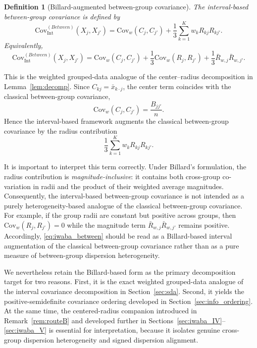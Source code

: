 \documentclass[preprint, times, 12pt, authoryear]{elsarticle}
\newtheorem{definition}{Definition}
\begin{document}
\begin{definition}[Billard-augmented between-group covariance]\label{def:iwaba_between}
	The interval-based between-group covariance is defined by
	\begin{equation}\label{eq:iwaba_between}
		\mathrm{Cov}_{\mathrm{Int}}^{(Between)}(X_j,X_{j'})
		=
		\mathrm{Cov}_w(C_j,C_{j'})
		+
		\frac{1}{3}\sum_{k=1}^K w_k R_{kj}R_{kj'}.
	\end{equation}
	Equivalently,
	\begin{equation}\label{eq:iwaba_decomp}
		\mathrm{Cov}_{\mathrm{Int}}^{(Between)}(X_j,X_{j'})
		=
		\mathrm{Cov}_w(C_j,C_{j'})
		+
		\frac{1}{3}\mathrm{Cov}_w(R_j,R_{j'})
		+
		\frac{1}{3}\bar R_{w,j}\bar R_{w,j'}.
	\end{equation}
\end{definition}

This is the weighted grouped-data analogue of the center--radius decomposition in Lemma~\ref{lem:decomp}. Since $C_{kj}=\bar x_{k\cdot j}$, the center term coincides with the classical between-group covariance,
\[
\mathrm{Cov}_w(C_j,C_{j'})=\frac{B_{jj'}}{n}.
\]
Hence the interval-based framework augments the classical between-group covariance by the radius contribution
\[
\frac{1}{3}\sum_{k=1}^K w_k R_{kj}R_{kj'}.
\]

It is important to interpret this term correctly. Under Billard's formulation, the radius contribution is \emph{magnitude-inclusive}: it contains both cross-group co-variation in radii and the product of their weighted average magnitudes. Consequently, the interval-based between-group covariance is not intended as a purely heterogeneity-based analogue of the classical between-group covariance. For example, if the group radii are constant but positive across groups, then $\mathrm{Cov}_w(R_j,R_{j'})=0$ while the magnitude term $\bar R_{w,j}\bar R_{w,j'}$ remains positive. Accordingly, \eqref{eq:iwaba_between} should be read as a Billard-based interval augmentation of the classical between-group covariance rather than as a pure measure of between-group dispersion heterogeneity.

We nevertheless retain the Billard-based form as the primary decomposition target for two reasons. First, it is the exact weighted grouped-data analogue of the interval covariance decomposition in Section~\ref{sec:sda}. Second, it yields the positive-semidefinite covariance ordering developed in Section~\ref{sec:info_ordering}. At the same time, the centered-radius companion introduced in Remark~\ref{rem:routeB} and developed further in Sections~\ref{sec:iwaba_IV}--\ref{sec:iwaba_V} is essential for interpretation, because it isolates genuine cross-group dispersion heterogeneity and signed dispersion alignment.
\end{document}

